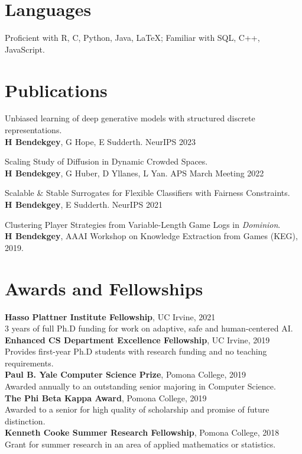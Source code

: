 \documentclass[margin]{res}
\begin{document}
\begin{resume}
\section{Languages}

Proficient with R, C, Python, Java, \LaTeX; Familiar with SQL, C++, JavaScript.


\section{Publications}
Unbiased learning of deep generative models with structured discrete representations. \\ \textbf{H Bendekgey}, G Hope, E Sudderth. NeurIPS 2023

Scaling Study of Diffusion in Dynamic Crowded Spaces. \\\textbf{H Bendekgey}, G Huber, D Yllanes, L Yan. APS March Meeting 2022

Scalable \& Stable Surrogates for Flexible Classifiers with Fairness Constraints. \\ \textbf{H Bendekgey}, E Sudderth. NeurIPS 2021

Clustering Player Strategies from Variable-Length Game Logs in \emph{Dominion}.\\ \textbf{H Bendekgey}, AAAI Workshop on Knowledge Extraction from Games (KEG), 2019.

\vspace{-9pt}
\section{Awards and Fellowships}
\textbf{Hasso Plattner Institute Fellowship}, UC Irvine, 2021\\
3 years of full Ph.D funding for work on adaptive, safe and human-centered AI.\\
\textbf{Enhanced CS Department Excellence Fellowship}, UC Irvine, 2019\\ Provides first-year Ph.D students with research funding and no teaching requirements.\\
\textbf{Paul B. Yale Computer Science Prize}, Pomona College, 2019\\Awarded annually to an outstanding senior majoring in Computer Science.\\
\textbf{The Phi Beta Kappa Award}, Pomona College, 2019\\Awarded to a senior for high quality of scholarship and promise of future distinction.\\
\textbf{Kenneth Cooke Summer Research Fellowship}, Pomona College, 2018\\Grant for summer research in an area of applied mathematics or statistics.\\

\end{resume}
\end{document}
